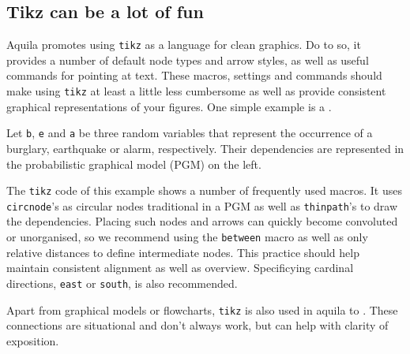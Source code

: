 \documentclass[hidelinks]{aquila-doc}
\begin{document}
{    \subsection{Tikz can be a lot of fun}


    Aquila promotes using \texttt{tikz} as a language for clean graphics.
    Do to so, it provides a number of default node types and arrow styles, as well as useful commands for pointing at text.
    These macros, settings and commands should make using \texttt{tikz} at least a little less cumbersome as well as provide consistent graphical representations of your figures.
    One simple example is a .


    \begin{example}
        Let \texttt{b}, \texttt{e} and \texttt{a} be three random variables that represent the occurrence of a burglary, earthquake or alarm, respectively.
        Their dependencies are represented in the probabilistic graphical model (PGM) on the left.
    \end{example}

    The \texttt{tikz} code of this example shows a number of frequently used macros.
    It uses \texttt{circnode}'s as circular nodes traditional in a PGM as well as \texttt{thinpath}'s to draw the dependencies.
    Placing such nodes and arrows can quickly become convoluted or unorganised, so we recommend using the \texttt{between} macro as well as only relative distances to define intermediate nodes.
    This practice should help maintain consistent alignment as well as overview.
    Specificying cardinal directions, \eg \texttt{east} or \texttt{south}, is also recommended.

    Apart from graphical models or flowcharts, \texttt{tikz} is also used in aquila to .
    These connections are situational and don't always work, but can help with clarity of exposition.

}
\end{document}
